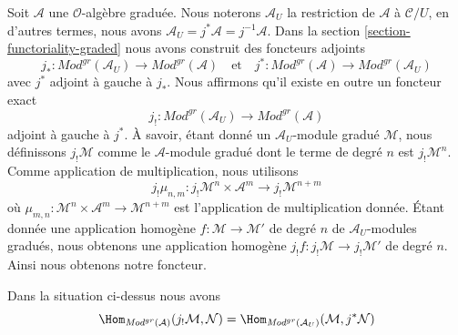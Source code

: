 \medskip\noindent
Soit $\mathcal{A}$ une $\mathcal{O}$-algèbre graduée.
Nous noterons $\mathcal{A}_U$ la restriction de $\mathcal{A}$ à $\mathcal{C}/U$, en d'autres termes, nous avons $\mathcal{A}_U = j^*\mathcal{A} = j^{-1}\mathcal{A}$.
Dans la section \ref{section-functoriality-graded}  nous avons construit des foncteurs adjoints
$$
j_* :
\textit{Mod}^{gr}(\mathcal{A}_U)
\longrightarrow
\textit{Mod}^{gr}(\mathcal{A})
\quad\text{et}\quad
j^* :
\textit{Mod}^{gr}(\mathcal{A})
\longrightarrow
\textit{Mod}^{gr}(\mathcal{A}_U)
$$
avec $j^*$ adjoint à gauche à $j_*$.
Nous affirmons qu'il existe en outre un foncteur exact
$$
j_! :
\textit{Mod}^{gr}(\mathcal{A}_U)
\longrightarrow
\textit{Mod}^{gr}(\mathcal{A})
$$
adjoint à gauche à $j^*$.
À savoir, étant donné un $\mathcal{A}_U$-module gradué $\mathcal{M}$, nous définissons $j_!\mathcal{M}$ comme le $\mathcal{A}$-module gradué dont le terme de degré $n$ est $j_!\mathcal{M}^n$.
Comme application de multiplication, nous utilisons
$$
j_!\mu_{n, m} :
j_!\mathcal{M}^n \times \mathcal{A}^m \to
j_!\mathcal{M}^{n + m}
$$
où $\mu_{m, n} : \mathcal{M}^n \times \mathcal{A}^m \to \mathcal{M}^{n + m}$ est l'application de multiplication donnée.
Étant donnée une application homogène $f : \mathcal{M} \to \mathcal{M}'$ de degré $n$ de $\mathcal{A}_U$-modules gradués, nous obtenons une application homogène $j_!f : j_!\mathcal{M} \to j_!\mathcal{M}'$ de degré $n$.
Ainsi nous obtenons notre foncteur.

\begin{lemma}
\label{lemma-extension-by-zero-graded}
Dans la situation ci-dessus nous avons
$$
\Hom_{\textit{Mod}^{gr}(\mathcal{A})}(
j_!\mathcal{M}, \mathcal{N}) =
\Hom_{\textit{Mod}^{gr}(\mathcal{A}_U)}(
\mathcal{M}, j^*\mathcal{N})
$$
\end{lemma}

